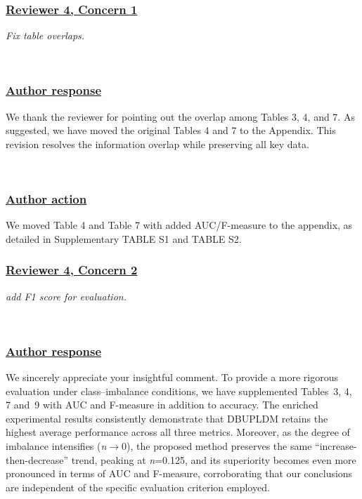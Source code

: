 \documentclass[journal,12pn, onecolumn]{IEEEtran}
\begin{document}
{{{%
\textcolor{customgreen}{
\subsubsection*{\underline{\textbf{Reviewer 4, Concern 1}}}
\emph{Fix table overlaps.}
}\\

{\color{black}
\subsubsection*{\textbf{\underline{Author response}}}
We thank the reviewer for pointing out the overlap among Tables 3, 4, and 7. As suggested, we have moved the original Tables 4 and 7 to the Appendix. This revision resolves the information overlap while preserving all key data.}
\\
{\color{black}
\subsubsection*{\textbf{\underline{Author action}}}
We moved Table 4 and Table 7 with added AUC/F-measure to the appendix, as detailed in Supplementary
TABLE S1 and TABLE S2.

\textcolor{customgreen}{
\subsubsection*{\underline{\textbf{Reviewer 4, Concern 2}}}
\emph{add F1 score for evaluation.}
}\\

{\color{black}
\subsubsection*{\textbf{\underline{Author response}}}
We sincerely appreciate your insightful comment.
To provide a more rigorous evaluation under class--imbalance conditions, we have supplemented Tables~3, 4, 7 and~9 with AUC and F-measure in addition to accuracy.
The enriched experimental results consistently demonstrate that DBUPLDM retains the highest average performance across all three metrics.
Moreover, as the degree of imbalance intensifies (\textit{n}$\to$0), the proposed method preserves the same ``increase-then-decrease'' trend, peaking at \textit{n}=0.125, and its superiority becomes even more pronounced in terms of AUC and F-measure, corroborating that our conclusions are independent of the specific evaluation criterion employed.
}\\

}}}}
\end{document}
